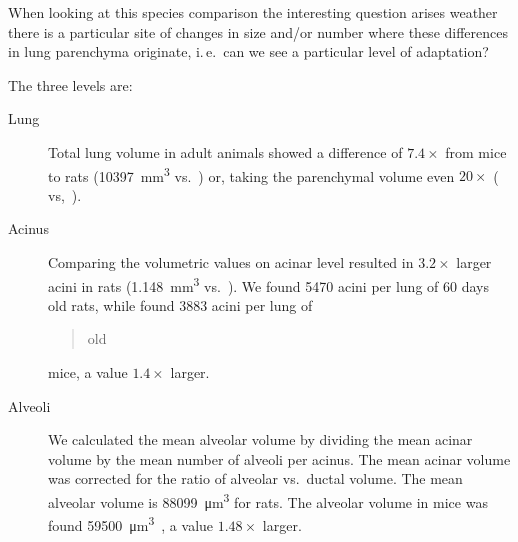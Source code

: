 \documentclass[paper=a4,DIV=calc,abstract,english]{scrartcl}
\newcommand{\ie}{i.\,e.\ }
\newcommand{\meantotalnumberofaciniVariant}{5470\xspace}
\newcommand{\meanacinarvolume}{1.148} %
\newcommand{\meantotallungvolume}{10397} %
\begin{document}
When looking at this species comparison the interesting question arises weather there is a particular site of changes in size and/or number where these differences in lung parenchyma originate, \ie can we see a particular level of adaptation?

The three levels are:
\begin{description}
	\item[Lung] Total lung volume in adult animals showed a difference of \(7.4\times\) from mice to rats (\SI{\meantotallungvolume}{\cubic\milli\meter} vs.\ \citep[\SI{1398}{\cubic\milli\meter}]{Vasilescu2012}) or, taking the parenchymal volume even \(20\times\) (\citep[\SI{8932}{\cubic\milli\meter}]{Tschanz2003} vs,\ \citep[\SI{444}{\cubic\milli\meter}]{Mund2008}).
	\item[Acinus] Comparing the volumetric values on acinar level resulted in \(3.2\times\) larger acini in rats (\SI{\meanacinarvolume}{\cubic\milli\meter} vs.\ \citep[\SI{0.36}{\cubic\milli\meter}]{Vasilescu2012}).
We found \meantotalnumberofaciniVariant acini per lung of 60 days old rats, while \citet{Vasilescu2012} found 3883 acini per lung of \blockquote{old} mice, a value \(1.4\times\) larger.
	\item[Alveoli] We calculated the mean alveolar volume by dividing the mean acinar volume by the mean number of alveoli per acinus. The mean acinar volume was corrected for the ratio of alveolar vs.\ ductal volume.
The mean alveolar volume is \SI{88099}{\cubic\micro\meter} for rats.
The alveolar volume in mice was found \SI{59500}{\cubic\micro\meter}~\citep{Knust2009}, a value \(1.48\times\) larger.
\end{description}
\end{document}
